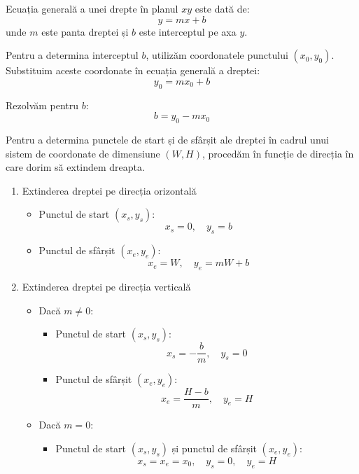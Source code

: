 \documentclass[a4paper,12pt]{report}
\begin{document}
Ecuația generală a unei drepte în planul $xy$ este dată de:
\[
    y = mx + b
\]
unde $m$ este panta dreptei și $b$ este interceptul pe axa $y$.

Pentru a determina interceptul $b$, utilizăm coordonatele punctului $(x_0, y_0)$. Substituim aceste coordonate în ecuația generală a dreptei:
\[
    y_0 = mx_0 + b
\]

Rezolvăm pentru $b$:
\[
    b = y_0 - mx_0
\]

Pentru a determina punctele de start și de sfârșit ale dreptei în cadrul unui sistem de coordonate de dimensiune $(W, H)$, procedăm în funcție de direcția în care dorim să extindem dreapta.
\begin{enumerate}
    \item Extinderea dreptei pe direcția orizontală
          \begin{itemize}
              \item Punctul de start $(x_s, y_s)$:
                    \[
                        x_s = 0, \quad y_s = b
                    \]
              \item Punctul de sfârșit $(x_e, y_e)$:
                    \[
                        x_e = W, \quad y_e = mW + b
                    \]
          \end{itemize}
    \item Extinderea dreptei pe direcția verticală
          \begin{itemize}
              \item  Dacă $m \neq 0$:
                    \begin{itemize}

                        \item Punctul de start $(x_s, y_s)$:
                              \[
                                  x_s = -\frac{b}{m}, \quad y_s = 0
                              \]
                        \item Punctul de sfârșit $(x_e, y_e)$:
                              \[
                                  x_e = \frac{H - b}{m}, \quad y_e = H
                              \]
                    \end{itemize}
              \item Dacă $m = 0$:
                    \begin{itemize}
                        \item Punctul de start $(x_s, y_s)$ și punctul de sfârșit $(x_e, y_e)$:
                              \[
                                  x_s = x_e = x_0, \quad y_s = 0, \quad y_e = H
                              \]
                    \end{itemize}

          \end{itemize}
\end{enumerate}
\end{document}
